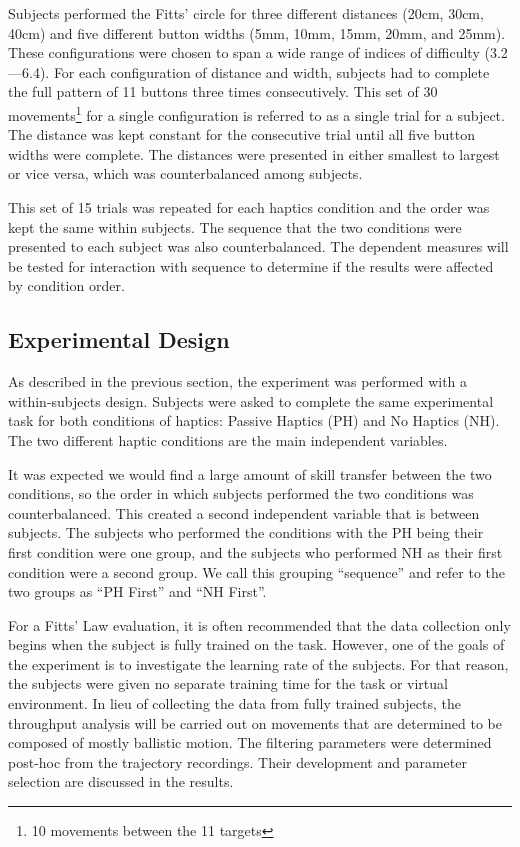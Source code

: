 Subjects performed the Fitts' circle for three different distances (20cm, 30cm, 40cm) and five different button widths (5mm, 10mm, 15mm, 20mm, and 25mm).
These configurations were chosen to span a wide range of indices of difficulty (3.2---6.4).
For each configuration of distance and width, subjects had to complete the full pattern of 11 buttons three times consecutively.
This set of 30 movements\footnote{10 movements between the 11 targets} for a single configuration is referred to as a single trial for a subject.
The distance was kept constant for the consecutive trial until all five button widths were complete.
The distances were presented in either smallest to largest or vice versa, which was counterbalanced among subjects.

This set of 15 trials was repeated for each haptics condition and the order was kept the same within subjects.
The sequence that the two conditions were presented to each subject was also counterbalanced.
The dependent measures will be tested for interaction with sequence to determine if the results were affected by condition order.

\subsection{Experimental Design}

As described in the previous section, the experiment was performed with a within-subjects design.
Subjects were asked to complete the same experimental task for both conditions of haptics: Passive Haptics (PH) and No Haptics (NH).
The two different haptic conditions are the main independent variables.

It was expected we would find a large amount of skill transfer between the two conditions, so the order in which subjects performed the two conditions was counterbalanced.
This created a second independent variable that is between subjects.
The subjects who performed the conditions with the PH being their first condition were one group, and the subjects who performed NH as their first condition were a second group.
We call this grouping ``sequence'' and refer to the two groups as ``PH First'' and ``NH First''.

For a Fitts' Law evaluation, it is often recommended that the data collection only begins when the subject is fully trained on the task.
However, one of the goals of the experiment is to investigate the learning rate of the subjects.
For that reason, the subjects were given no separate training time for the task or virtual environment.
In lieu of collecting the data from fully trained subjects, the throughput analysis will be carried out on movements that are determined to be composed of mostly ballistic motion.
The filtering parameters were determined post-hoc from the trajectory recordings.
Their development and parameter selection are discussed in the results.

